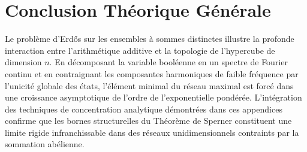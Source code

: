 \documentclass[12pt,a4paper]{article}
\begin{document}
\section{Conclusion Théorique Générale}
Le problème d'Erdős sur les ensembles à sommes distinctes illustre la profonde interaction entre l'arithmétique additive et la topologie de l'hypercube de dimension $n$. En décomposant la variable booléenne en un spectre de Fourier continu et en contraignant les composantes harmoniques de faible fréquence par l'unicité globale des états, l'élément minimal du réseau maximal est forcé dans une croissance asymptotique de l'ordre de l'exponentielle pondérée.
L'intégration des techniques de concentration analytique démontrées dans ces appendices confirme que les bornes structurelles du Théorème de Sperner constituent une limite rigide infranchissable dans des réseaux unidimensionnels contraints par la sommation abélienne.
\end{document}
